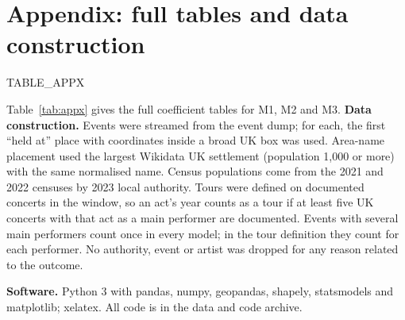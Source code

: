 \documentclass[11pt,a4paper]{article}
\begin{document}
\appendix
\section{Appendix: full tables and data construction}
{{TABLE_APPX}}

Table~\ref{tab:appx} gives the full coefficient tables for M1, M2 and M3. \textbf{Data construction.} Events were streamed from the event dump; for each, the first ``held at'' place with coordinates inside a broad UK box was used. Area-name placement used the largest Wikidata UK settlement (population 1,000 or more) with the same normalised name. Census populations come from the 2021 and 2022 censuses by 2023 local authority. Tours were defined on documented concerts in the window, so an act's year counts as a tour if at least five UK concerts with that act as a main performer are documented. Events with several main performers count once in every model; in the tour definition they count for each performer. No authority, event or artist was dropped for any reason related to the outcome.

\textbf{Software.} Python 3 with pandas, numpy, geopandas, shapely, statsmodels and matplotlib; xelatex. All code is in the data and code archive.
\end{document}
